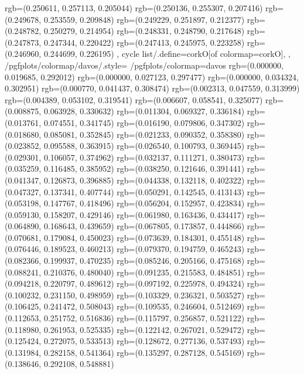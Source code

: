 {{{					rgb=(0.250611, 0.257113, 0.205044)
					rgb=(0.250136, 0.255307, 0.207416)
					rgb=(0.249678, 0.253559, 0.209848)
					rgb=(0.249229, 0.251897, 0.212377)
					rgb=(0.248782, 0.250279, 0.214954)
					rgb=(0.248331, 0.248790, 0.217648)
					rgb=(0.247873, 0.247344, 0.220422)
					rgb=(0.247413, 0.245975, 0.223258)
					rgb=(0.246960, 0.244699, 0.226195)
			},
		cycle list/.define={corkO}{[of colormap=corkO]},
		},
		/pgfplots/colormap/davos/.style={
			/pgfplots/colormap={davos}{%
					rgb=(0.000000, 0.019685, 0.292012)
					rgb=(0.000000, 0.027123, 0.297477)
					rgb=(0.000000, 0.034324, 0.302951)
					rgb=(0.000770, 0.041437, 0.308474)
					rgb=(0.002313, 0.047559, 0.313999)
					rgb=(0.004389, 0.053102, 0.319541)
					rgb=(0.006607, 0.058541, 0.325077)
					rgb=(0.008875, 0.063928, 0.330632)
					rgb=(0.011304, 0.069327, 0.336184)
					rgb=(0.013761, 0.074551, 0.341745)
					rgb=(0.016190, 0.079806, 0.347302)
					rgb=(0.018680, 0.085081, 0.352845)
					rgb=(0.021233, 0.090352, 0.358380)
					rgb=(0.023852, 0.095588, 0.363915)
					rgb=(0.026540, 0.100793, 0.369445)
					rgb=(0.029301, 0.106057, 0.374962)
					rgb=(0.032137, 0.111271, 0.380473)
					rgb=(0.035259, 0.116485, 0.385952)
					rgb=(0.038250, 0.121646, 0.391441)
					rgb=(0.041347, 0.126873, 0.396885)
					rgb=(0.044338, 0.132118, 0.402322)
					rgb=(0.047327, 0.137341, 0.407744)
					rgb=(0.050291, 0.142545, 0.413143)
					rgb=(0.053198, 0.147767, 0.418496)
					rgb=(0.056204, 0.152957, 0.423834)
					rgb=(0.059130, 0.158207, 0.429146)
					rgb=(0.061980, 0.163436, 0.434417)
					rgb=(0.064890, 0.168643, 0.439659)
					rgb=(0.067805, 0.173857, 0.444866)
					rgb=(0.070681, 0.179084, 0.450023)
					rgb=(0.073639, 0.184301, 0.455148)
					rgb=(0.076446, 0.189523, 0.460213)
					rgb=(0.079370, 0.194759, 0.465243)
					rgb=(0.082366, 0.199937, 0.470235)
					rgb=(0.085246, 0.205166, 0.475168)
					rgb=(0.088241, 0.210376, 0.480040)
					rgb=(0.091235, 0.215583, 0.484851)
					rgb=(0.094218, 0.220797, 0.489612)
					rgb=(0.097192, 0.225978, 0.494324)
					rgb=(0.100232, 0.231150, 0.498959)
					rgb=(0.103329, 0.236321, 0.503527)
					rgb=(0.106425, 0.241472, 0.508043)
					rgb=(0.109535, 0.246604, 0.512469)
					rgb=(0.112653, 0.251752, 0.516836)
					rgb=(0.115797, 0.256857, 0.521122)
					rgb=(0.118980, 0.261953, 0.525335)
					rgb=(0.122142, 0.267021, 0.529472)
					rgb=(0.125424, 0.272075, 0.533513)
					rgb=(0.128672, 0.277136, 0.537493)
					rgb=(0.131984, 0.282158, 0.541364)
					rgb=(0.135297, 0.287128, 0.545169)
					rgb=(0.138646, 0.292108, 0.548881)
}}}
